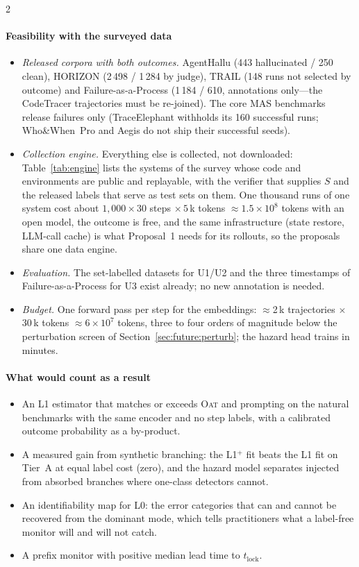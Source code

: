 \begin{multicols}{2}
\paragraph{Feasibility with the surveyed data}
\begin{itemize}[leftmargin=1.1em]
\item \emph{Released corpora with both outcomes.} AgentHallu (443 hallucinated / 250 clean), HORIZON (2\,498 / 1\,284 by judge), TRAIL (148 runs not selected by outcome) and Failure-as-a-Process (1\,184 / 610, annotations only---the CodeTracer trajectories must be re-joined). The core MAS benchmarks release failures only (TraceElephant withholds its 160 successful runs; Who\&When~Pro and Aegis do not ship their successful seeds).
\item \emph{Collection engine.} Everything else is collected, not downloaded: Table~\ref{tab:engine} lists the systems of the survey whose code and environments are public and replayable, with the verifier that supplies $S$ and the released labels that serve as test sets on them. One thousand runs of one system cost about $1{,}000\times30$ steps $\times\,5$\,k tokens $\approx1.5\times10^{8}$ tokens with an open model, the outcome is free, and the same infrastructure (state restore, LLM-call cache) is what Proposal~1 needs for its rollouts, so the proposals share one data engine.
\item \emph{Evaluation.} The set-labelled datasets for U1/U2 and the three timestamps of Failure-as-a-Process for U3 exist already; no new annotation is needed.
\item \emph{Budget.} One forward pass per step for the embeddings: $\approx$2\,k trajectories $\times$ 30\,k tokens $\approx6\times10^{7}$ tokens, three to four orders of magnitude below the perturbation screen of Section~\ref{sec:future:perturb}; the hazard head trains in minutes.
\end{itemize}

\paragraph{What would count as a result}
\begin{itemize}[leftmargin=1.1em]
\item An L1 estimator that matches or exceeds \textsc{Oat} and prompting on the natural benchmarks with the same encoder and no step labels, with a calibrated outcome probability as a by-product.
\item A measured gain from synthetic branching: the L1$^{+}$ fit beats the L1 fit on Tier~A at equal label cost (zero), and the hazard model separates injected from absorbed branches where one-class detectors cannot.
\item An identifiability map for L0: the error categories that can and cannot be recovered from the dominant mode, which tells practitioners what a label-free monitor will and will not catch.
\item A prefix monitor with positive median lead time to $t_{\mathrm{lock}}$.
\end{itemize}
\end{multicols}

